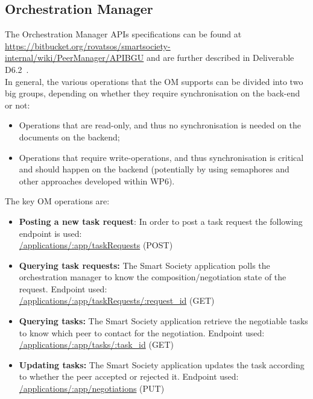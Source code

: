 \subsection{Orchestration Manager}
The Orchestration Manager APIs specifications can be found at
\url{https://bitbucket.org/rovatsos/smartsociety-internal/wiki/PeerManager/APIBGU}
and are further described in Deliverable D6.2~\cite{D6.2}. \\
In general, the various operations that the OM supports can be divided
into two big groups, depending on whether they require synchronisation
on the back-end or not:
\begin{itemize}
\item Operations that are read-only, and thus no synchronisation is
  needed on the documents on the backend;\
\item Operations that require write-operations, and thus
  synchronisation is critical and should happen on the backend
  (potentially by using semaphores and other approaches developed
  within WP6).
\end{itemize}
The key OM operations are:
\begin{itemize}
\item {\bf Posting a new task request}: In order to post a task request the following endpoint is used:\\
	\url{/applications/:app/taskRequests} (\textsc{POST})
\item {\bf Querying task requests:} The Smart Society application polls the orchestration manager to know the composition/negotiation state of the request. Endpoint used:\\
  \url{/applications/:app/taskRequests/:request_id} (\textsc{GET})
\item {\bf Querying tasks:} The Smart Society application retrieve the negotiable tasks to know which peer to contact for the negotiation. Endpoint used:\\
  \url{/applications/:app/tasks/:task_id} (\textsc{GET})
\item {\bf Updating tasks:} The Smart Society application updates the task according to whether the peer accepted or rejected it. Endpoint used:\\
  \url{/applications/:app/negotiations} (\textsc{PUT})
\end{itemize}
